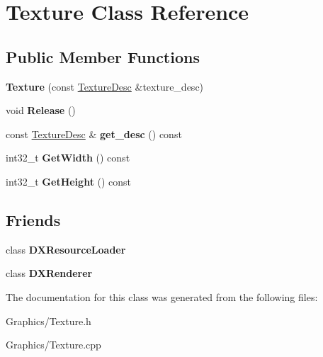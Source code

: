 \hypertarget{classTexture}{}\section{Texture Class Reference}
\label{classTexture}
\subsection*{Public Member Functions}
\begin{DoxyCompactItemize}
\item 
\mbox{\label{classTexture_a3bde2eacf781e31bd954383e5ea0dbde}} 
{\bfseries Texture} (const \hyperlink{structTextureDesc}{Texture\+Desc} \&texture\+\_\+desc)
\item 
\mbox{\label{classTexture_a9262c7fa9242a06ad4900d93d186a941}} 
void {\bfseries Release} ()
\item 
\mbox{\label{classTexture_ada3f2e9a878bef24145e986b9f951bb2}} 
const \hyperlink{structTextureDesc}{Texture\+Desc} \& {\bfseries get\+\_\+desc} () const
\item 
\mbox{\label{classTexture_a187a06ab75437b22588c53ae829260fa}} 
int32\+\_\+t {\bfseries Get\+Width} () const
\item 
\mbox{\label{classTexture_a130feaf38af110458eec7d0a0ccd65d0}} 
int32\+\_\+t {\bfseries Get\+Height} () const
\end{DoxyCompactItemize}
\subsection*{Friends}
\begin{DoxyCompactItemize}
\item 
\mbox{\label{classTexture_a871268c492209c5a9db9dc2db99f4d04}} 
class {\bfseries D\+X\+Resource\+Loader}
\item 
\mbox{\label{classTexture_a14ab6f966322dccbf6597d0c82bf48c6}} 
class {\bfseries D\+X\+Renderer}
\end{DoxyCompactItemize}


The documentation for this class was generated from the following files\+:\begin{DoxyCompactItemize}
\item 
Graphics/Texture.\+h\item 
Graphics/Texture.\+cpp\end{DoxyCompactItemize}
